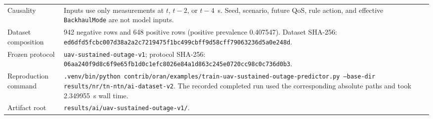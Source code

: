\begin{table}[t]
\begin{tabular}{p{} p{}}
Causality & Inputs use only measurements at $t$, $t-2$, or $t-4$~s.  Seed, scenario, future QoS, rule action, and effective \texttt{Backhaul\allowbreak Mode} are not model inputs. \\
Dataset composition & 942 negative rows and 648 positive rows (positive prevalence 0.407547).  Dataset SHA-256: \texttt{ed6dfd5fcbc007d3\allowbreak 8a2a2c7219475f1b\allowbreak c499cbff9d58cff7\allowbreak 9063236d5a0e248d}. \\
Frozen protocol & \texttt{uav-\allowbreak sustained-\allowbreak outage-\allowbreak v1}; protocol SHA-256: \texttt{06aa240f9d8c6f9e\allowbreak 65fb1d0c1efc8026\allowbreak e84a1d863c245e07\allowbreak 20cc98c0c736d0b3}. \\
Reproduction command & \texttt{.venv/\allowbreak bin/\allowbreak python contrib/\allowbreak oran/\allowbreak examples/\allowbreak train-\allowbreak uav-\allowbreak sustained-\allowbreak outage-\allowbreak predictor.py --base-dir results/\allowbreak nr/\allowbreak tn-\allowbreak ntn/\allowbreak ai-\allowbreak dataset-\allowbreak v2}.  The recorded completed run used the corresponding absolute paths and took 2.349955~s wall time. \\
Artifact root & \texttt{results/\allowbreak ai/\allowbreak uav-\allowbreak sustained-\allowbreak outage-\allowbreak v1/\allowbreak }. \\
\hline
\end{tabular}
\end{table}

